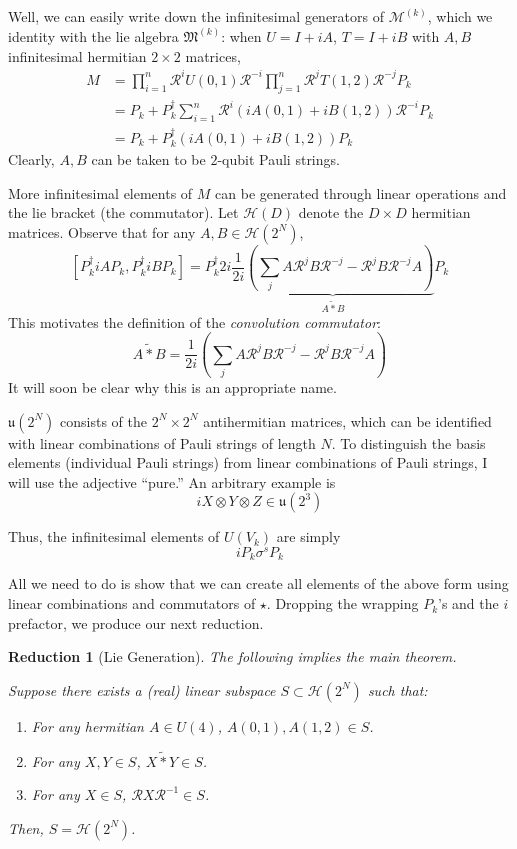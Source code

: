 \documentclass[fleqn,12pt]{article}
\newcommand{\ts}{\tilde{*}}
\newtheorem{reduction}{Reduction}
\begin{document}
Well, we can easily write down the infinitesimal generators
of $\mathcal{M}^{(k)}$, which we identity with the lie algebra
$\mathfrak{M}^{(k)}$:
when $U = I + iA$, $T = I + iB$ with $A,B$ infinitesimal
hermitian $2\times 2$ matrices,
\begin{align*}
    M & = \prod_{i = 1}^n \mathcal{R}^i U(0,1) \mathcal{R}^{-i} \prod_{j = 1}^n \mathcal{R}^j T(1,2) \mathcal{R}^{-j} P_k \\
      & = P_k + P^\dagger_k\sum_{i = 1}^n \mathcal{R}^i\left(iA(0,1) + iB(1,2)\right) \mathcal{R}^{-i} P_k                \\
      & = P_k + P^\dagger_k\left(iA(0,1) + iB(1,2)\right) P_k \tag{$\star$}
\end{align*}
Clearly, $A,B$ can be taken to be $2$-qubit Pauli strings.

More infinitesimal elements of $M$ can be generated through
linear operations and the lie bracket (the commutator).
Let $\mathcal{H}(D)$ denote the $D\times D$ hermitian matrices.
Observe that for any $A,B\in \mathcal{H}(2^N)$,
\[
    [P^\dagger_k iA P_k, P^\dagger_k iB P_k]
    = P^\dagger_k 2i\underbrace{\frac{1}{2i}\left(\sum_j A \mathcal{R}^j B \mathcal{R}^{-j}
        - \mathcal{R}^j B\mathcal{R}^{-j}  A\right)}_{A \ts B} P_k
\]
This motivates the definition of the \emph{convolution commutator}:
\[
    A \ts B = \frac{1}{2i}\left(\sum_j A \mathcal{R}^j B \mathcal{R}^{-j}
    - \mathcal{R}^j B\mathcal{R}^{-j}  A\right)
\]
It will soon be clear why this is an appropriate name.

$\mathfrak{u}(2^N)$ consists of the $2^N\times 2^N$ antihermitian matrices,
which can be identified with linear combinations of
Pauli strings of length $N$. To distinguish the basis elements
(individual Pauli strings)
from linear combinations of Pauli strings, I will use the adjective ``pure.''
An arbitrary example is
\[
    iX\otimes Y\otimes Z \in \mathfrak{u}(2^3)
\]

Thus, the infinitesimal elements of $U(V_k)$ are simply
\[
    i P_k \sigma^s P_k
\]

All we need to do is show that we can create all elements of the above form using
linear combinations and commutators of $\star$.
Dropping the wrapping $P_k$'s and the $i$ prefactor,
we produce our next reduction.
\begin{reduction}
    [Lie Generation]
    \label{reduction:lie-generation}
    The following implies the main theorem.

    Suppose there exists a (real) linear subspace $S\subset \mathcal{H}(2^N)$ such that:
    \begin{enumerate}
        \item For any hermitian $A\in U(4)$, $A(0,1), A(1,2) \in S$.
        \item For any $X, Y \in S$, $X \ts Y \in S$.
        \item For any $X \in S$, $\mathcal{R} X \mathcal{R}^{-1} \in S$.
    \end{enumerate}
    Then, $S = \mathcal{H}(2^N)$.
\end{reduction}
\end{document}
